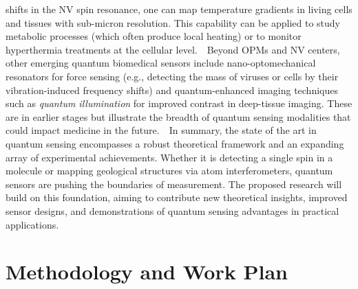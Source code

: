 \documentclass[12pt]{article}
\begin{document}
shifts in the NV spin resonance, one can map temperature gradients in
living cells and tissues with sub-micron
resolution\cite{Aslam2023}. This capability can be applied to study
metabolic processes (which often produce local heating) or to monitor
hyperthermia treatments at the cellular level.    Beyond OPMs and NV
centers, other emerging quantum biomedical sensors include
nano-optomechanical resonators for force sensing (e.g., detecting the
mass of viruses or cells by their vibration-induced frequency shifts)
and quantum-enhanced imaging techniques such as \textit{quantum
  illumination} for improved contrast in deep-tissue imaging. These
are in earlier stages but illustrate the breadth of quantum sensing
modalities that could impact medicine in the future.    In summary,
the state of the art in quantum sensing encompasses a robust
theoretical framework and an expanding array of experimental
achievements. Whether it is detecting a single spin in a molecule or
mapping geological structures via atom interferometers, quantum
sensors are pushing the boundaries of measurement. The proposed
research will build on this foundation, aiming to contribute new
theoretical insights, improved sensor designs, and demonstrations of
quantum sensing advantages in practical applications.   
\section{Methodology and Work Plan}
\end{document}
